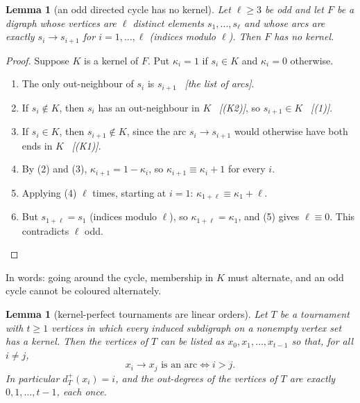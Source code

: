 \documentclass[11pt]{article}
\theoremstyle{plain}
\newtheorem{lemma}[theorem]{Lemma}
\theoremstyle{definition}
\theoremstyle{remark}
\newcommand{\dout}{d^{+}}
\newcommand{\why}[1]{\unskip\ \textit{[#1]}}
\newenvironment{steps}{\begin{enumerate}[label=(\arabic*),leftmargin=2.2em,itemsep=0.35em]}{\end{enumerate}}
\begin{document}
\begin{lemma}[an odd directed cycle has no kernel]\label{lem:odd-dicycle}
Let $\ell\ge 3$ be odd and let $F$ be a digraph whose vertices are $\ell$ distinct elements
$s_1,\dots,s_\ell$ and whose arcs are exactly $s_i\to s_{i+1}$ for $i=1,\dots,\ell$ (indices
modulo $\ell$). Then $F$ has no kernel.
\end{lemma}

\begin{proof}
Suppose $K$ is a kernel of $F$. Put $\kappa_i=1$ if $s_i\in K$ and $\kappa_i=0$ otherwise.
\begin{steps}
  \item The only out-neighbour of $s_i$ is $s_{i+1}$ \why{the list of arcs}.
  \item If $s_i\notin K$, then $s_i$ has an out-neighbour in $K$ \why{(K2)}, so $s_{i+1}\in K$
    \why{(1)}.
  \item If $s_i\in K$, then $s_{i+1}\notin K$, since the arc $s_i\to s_{i+1}$ would otherwise
    have both ends in $K$ \why{(K1)}.
  \item By (2) and (3), $\kappa_{i+1}=1-\kappa_i$, so $\kappa_{i+1}\equiv\kappa_i+1$ for every $i$.
  \item Applying (4) $\ell$ times, starting at $i=1$: $\kappa_{1+\ell}\equiv\kappa_1+\ell$.
  \item But $s_{1+\ell}=s_1$ (indices modulo $\ell$), so $\kappa_{1+\ell}=\kappa_1$, and (5)
    gives $\ell\equiv 0$. This contradicts $\ell$ odd. \qedhere
\end{steps}
\end{proof}

In words: going around the cycle, membership in $K$ must alternate, and an odd cycle cannot be
coloured alternately.

\begin{lemma}[kernel-perfect tournaments are linear orders]\label{lem:tournament}
Let $T$ be a tournament with $t\ge 1$ vertices in which every induced subdigraph on a nonempty
vertex set has a kernel. Then the vertices of $T$ can be listed as $x_0,x_1,\dots,x_{t-1}$ so
that, for all $i\ne j$,
\[
  x_i\to x_j \text{ is an arc}\iff i>j .
\]
In particular $\dout_T(x_i)=i$, and the out-degrees of the vertices of $T$ are exactly
$0,1,\dots,t-1$, each once.
\end{lemma}
\end{document}

